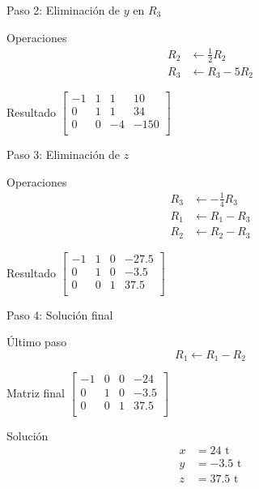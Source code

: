 \documentclass{beamer}
\begin{document}
\begin{frame}{Paso 2: Eliminación de $y$ en $R_3$}
\begin{block}{Operaciones}
\begin{align*}
R_2 &\leftarrow \tfrac{1}{2} R_2 \\
R_3 &\leftarrow R_3 - 5R_2
\end{align*}
\end{block}

\begin{exampleblock}{Resultado}
\centering
$\left[
\begin{array}{ccc|c}
-1 & 1 & 1 & 10 \\
0 & 1 & 1 & 34 \\
0 & 0 & -4 & -150 \\
\end{array}
\right]$
\end{exampleblock}
\end{frame}

\begin{frame}{Paso 3: Eliminación de $z$}
\begin{block}{Operaciones}
\begin{align*}
R_3 &\leftarrow -\tfrac{1}{4}R_3 \\
R_1 &\leftarrow R_1 - R_3 \\
R_2 &\leftarrow R_2 - R_3
\end{align*}
\end{block}

\begin{exampleblock}{Resultado}
\centering
$\left[
\begin{array}{ccc|c}
-1 & 1 & 0 & -27.5 \\
0 & 1 & 0 & -3.5 \\
0 & 0 & 1 & 37.5 \\
\end{array}
\right]$
\end{exampleblock}
\end{frame}

\begin{frame}{Paso 4: Solución final}
\begin{block}{Último paso}
\[ R_1 \leftarrow R_1 - R_2 \]
\end{block}

\begin{alertblock}{Matriz final}
\centering
$\left[
\begin{array}{ccc|c}
-1 & 0 & 0 & -24 \\
0 & 1 & 0 & -3.5 \\
0 & 0 & 1 & 37.5 \\
\end{array}
\right]$
\end{alertblock}

\begin{block}{Solución}
\begin{align*}
x &= 24 \text{ t} \\
y &= -3.5 \text{ t} \\
z &= 37.5 \text{ t}
\end{align*}
\end{block}
\end{frame}
\end{document}
